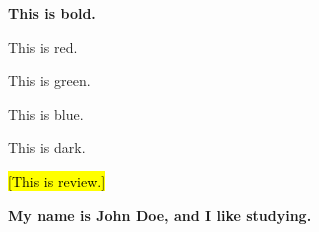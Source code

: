 \documentclass[11pt]{article}
\begin{document}
{\bfseries This is bold.}

{\color{red}This is red.}

{\color{green}This is green.}

{\color{blue}This is blue.}

{\color{black}This is dark.}

\textcolor{red}{\hl{[This is review.]}}

{\bfseries My name is John Doe, and I like studying.}
\end{document}
